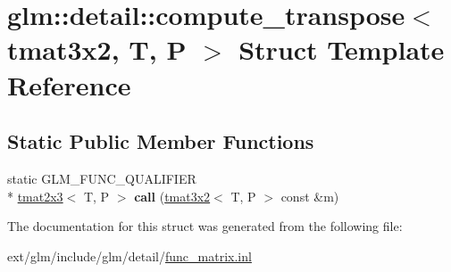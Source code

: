 \hypertarget{structglm_1_1detail_1_1compute__transpose_3_01tmat3x2_00_01_t_00_01_p_01_4}{\section{glm\-:\-:detail\-:\-:compute\-\_\-transpose$<$ tmat3x2, T, P $>$ Struct Template Reference}
\label{structglm_1_1detail_1_1compute__transpose_3_01tmat3x2_00_01_t_00_01_p_01_4}
}
\subsection*{Static Public Member Functions}
\begin{DoxyCompactItemize}
\item 
\hypertarget{structglm_1_1detail_1_1compute__transpose_3_01tmat3x2_00_01_t_00_01_p_01_4_a0e7ec56e3457a7d45c0774b2b1c4d28c}{static G\-L\-M\-\_\-\-F\-U\-N\-C\-\_\-\-Q\-U\-A\-L\-I\-F\-I\-E\-R \\*
\hyperlink{structglm_1_1tmat2x3}{tmat2x3}$<$ T, P $>$ {\bfseries call} (\hyperlink{structglm_1_1tmat3x2}{tmat3x2}$<$ T, P $>$ const \&m)}\label{structglm_1_1detail_1_1compute__transpose_3_01tmat3x2_00_01_t_00_01_p_01_4_a0e7ec56e3457a7d45c0774b2b1c4d28c}

\end{DoxyCompactItemize}


The documentation for this struct was generated from the following file\-:\begin{DoxyCompactItemize}
\item 
ext/glm/include/glm/detail/\hyperlink{func__matrix_8inl}{func\-\_\-matrix.\-inl}\end{DoxyCompactItemize}

